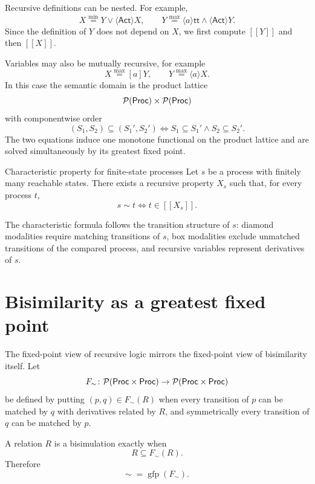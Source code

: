 \documentclass[a4paper]{article}
\newcommand{\Proc}{\mathsf{Proc}}
\newcommand{\Act}{\mathsf{Act}}
\newcommand{\ttt}{\mathsf{tt}}
\newcommand{\sem}[1]{[\![#1]\!]}
\newcommand{\gfp}{\operatorname{gfp}}
\begin{document}
Recursive definitions can be nested.
For example,
\[
    X\overset{\min}{=}
    Y\lor\langle\Act\rangle X,
    \qquad
    Y\overset{\max}{=}
    \langle a\rangle\ttt\land\langle\Act\rangle Y.
\]
Since the definition of \(Y\) does not depend on \(X\), we first compute \(\sem{Y}\) and then \(\sem{X}\).

Variables may also be mutually recursive, for example
\[
    X\overset{\max}{=}[a]Y,
    \qquad
    Y\overset{\max}{=}\langle a\rangle X.
\]
In this case the semantic domain is the product lattice
\[
    \powerset(\Proc)\cartesianprod\powerset(\Proc)
\]
with componentwise order
\[
    (S_1,S_2)\subseteq(S_1',S_2')
    \iff
    S_1\subseteq S_1'\land S_2\subseteq S_2'.
\]
The two equations induce one monotone functional on the product lattice and are solved simultaneously by its greatest fixed point.

\begin{snippettheorem}{Characteristic property for finite-state processes}
    Let \(s\) be a process with finitely many reachable states.
    There exists a recursive property \(X_s\) such that, for every process \(t\),
    \[
        s\sim t
        \iff
        t\in\sem{X_s}.
    \]
\end{snippettheorem}

The characteristic formula follows the transition structure of \(s\): diamond modalities require matching transitions of \(s\), box modalities exclude unmatched transitions of the compared process, and recursive variables represent derivatives of \(s\).

\section{Bisimilarity as a greatest fixed point}

The fixed-point view of recursive logic mirrors the fixed-point view of bisimilarity itself.
Let
\[
    F_{\sim}\colon\powerset(\Proc\cartesianprod\Proc)
    \fromto
    \powerset(\Proc\cartesianprod\Proc)
\]
be defined by putting \((p,q)\in F_{\sim}(R)\) when every transition of \(p\) can be matched by \(q\) with derivatives related by \(R\), and symmetrically every transition of \(q\) can be matched by \(p\).

A relation \(R\) is a bisimulation exactly when
\[
    R\subseteq F_{\sim}(R).
\]
Therefore
\[
    \sim\;=\gfp(F_{\sim}).
\]
\end{document}
